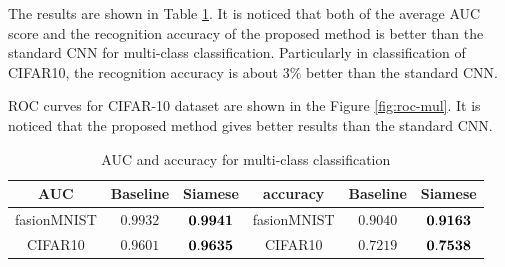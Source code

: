 \documentclass[a4paper,12pt]{article}
\begin{document}
The results are shown in Table \ref{table:AUC_ACC_multi}.
It is noticed that both of the average AUC score and the recognition accuracy of the proposed method is better than the standard CNN for multi-class classification.
Particularly in classification of CIFAR10, the recognition accuracy is about 3$\%$ better than the standard CNN.


ROC curves for CIFAR-10 dataset are shown in the Figure \ref{fig:roc-mul}. 
It is noticed that the proposed method gives better results than the standard CNN.




\begin{table}[ht]
\begin{center}
\caption{AUC and accuracy for multi-class classification}
\label{table:AUC_ACC_multi}
\begin{tabular}{|c|c|c||c|c|c|} \hline
AUC & Baseline & Siamese & accuracy &  Baseline & Siamese  \\ \hline \hline
fasionMNIST & $0.9932$    & ${\bf 0.9941}$  &  fasionMNIST  & $0.9040$   &  ${\bf 0.9163}$ \\ \hline
CIFAR10  & $0.9601$      &  ${\bf 0.9635}$     &  CIFAR10   & $0.7219$     &${\bf 0.7538}$ \\ \hline
\end{tabular}
\end{center}
\end{table}
\clearpage
\end{document}
